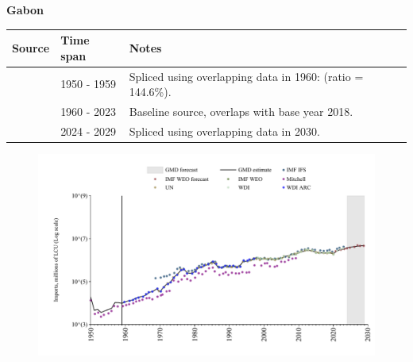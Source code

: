 \documentclass[12pt,a4paper,landscape]{article}
\begin{document}
\begin{adjustbox}{max totalsize={\paperwidth}{\paperheight},center}
\begin{minipage}[t][\textheight][t]{\textwidth}
\vspace*{0.5cm}
{}
\begin{center}
{\Large\bfseries Gabon}
\end{center}
\vspace{0.5cm}
\begin{table}[H]
\centering
\small
\begin{tabular}{|l|l|l|}
\hline
\textbf{Source} & \textbf{Time span} & \textbf{Notes} \\
\hline
\rowcolor{white}\cite{Mitchell}& 1950 - 1959 &Spliced using overlapping data in 1960: (ratio = 144.6\%).\\
\rowcolor{lightgray}\cite{WDI}& 1960 - 2023 &Baseline source, overlaps with base year 2018.\\
\rowcolor{white}\cite{IMF_WEO_forecast}& 2024 - 2029 &Spliced using overlapping data in 2030.\\
\hline
\end{tabular}
\end{table}
\begin{figure}[H]
\centering
\includegraphics[width=\textwidth,height=0.6\textheight,keepaspectratio]{graphs/GAB_imports.pdf}
\end{figure}
\end{minipage}
\end{adjustbox}
\end{document}
